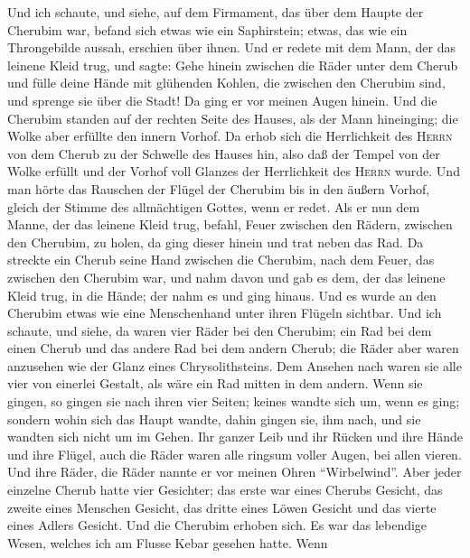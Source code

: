  Und ich schaute, und siehe, auf dem Firmament, das über
dem Haupte der Cherubim war, befand sich etwas wie ein Saphirstein;
etwas, das wie ein Throngebilde aussah, erschien über ihnen.
 Und er redete mit dem Mann, der das leinene Kleid trug,
und sagte: Gehe hinein zwischen die Räder unter dem Cherub und fülle
deine Hände mit glühenden Kohlen, die zwischen den Cherubim sind, und
sprenge sie über die Stadt! Da ging er vor meinen Augen hinein.
 Und die Cherubim standen auf der rechten Seite des
Hauses, als der Mann hineinging; die Wolke aber erfüllte den innern
Vorhof.  Da erhob sich die Herrlichkeit des \textsc{Herrn}
von dem Cherub zu der Schwelle des Hauses hin, also daß der Tempel von
der Wolke erfüllt und der Vorhof voll Glanzes der Herrlichkeit des
\textsc{Herrn} wurde.  Und man hörte das Rauschen der
Flügel der Cherubim bis in den äußern Vorhof, gleich der Stimme des
allmächtigen Gottes, wenn er redet.  Als er nun dem Manne,
der das leinene Kleid trug, befahl, Feuer zwischen den Rädern, zwischen
den Cherubim, zu holen, da ging dieser hinein und trat neben das Rad.
 Da streckte ein Cherub seine Hand zwischen die Cherubim,
nach dem Feuer, das zwischen den Cherubim war, und nahm davon und gab es
dem, der das leinene Kleid trug, in die Hände; der nahm es und ging
hinaus.  Und es wurde an den Cherubim etwas wie eine
Menschenhand unter ihren Flügeln sichtbar.  Und ich
schaute, und siehe, da waren vier Räder bei den Cherubim; ein Rad bei
dem einen Cherub und das andere Rad bei dem andern Cherub; die Räder
aber waren anzusehen wie der Glanz eines Chrysolithsteins.
 Dem Ansehen nach waren sie alle vier von einerlei
Gestalt, als wäre ein Rad mitten in dem andern.  Wenn sie
gingen, so gingen sie nach ihren vier Seiten; keines wandte sich um,
wenn es ging; sondern wohin sich das Haupt wandte, dahin gingen sie, ihm
nach, und sie wandten sich nicht um im Gehen.  Ihr ganzer
Leib und ihr Rücken und ihre Hände und ihre Flügel, auch die Räder waren
alle ringsum voller Augen, bei allen vieren.  Und ihre
Räder, die Räder nannte er vor meinen Ohren ``Wirbelwind''.
 Aber jeder einzelne Cherub hatte vier Gesichter; das
erste war eines Cherubs Gesicht, das zweite eines Menschen Gesicht, das
dritte eines Löwen Gesicht und das vierte eines Adlers Gesicht.
 Und die Cherubim erhoben sich. Es war das lebendige
Wesen, welches ich am Flusse Kebar gesehen hatte.  Wenn
